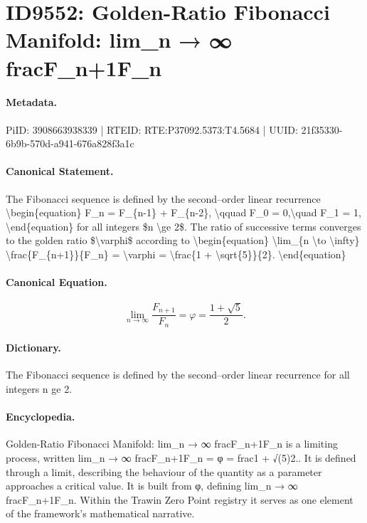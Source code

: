 \section*{ID9552: Golden-Ratio Fibonacci Manifold: lim\_n → ∞ fracF\_n+1F\_n}
\paragraph{Metadata.}
PiID: 3908663938339 | RTEID: RTE:P37092.5373:T4.5684 | UUID: 21f35330-6b9b-570d-a941-676a828f3a1c

\paragraph{Canonical Statement.}
The Fibonacci sequence is defined by the second–order linear recurrence \textbackslash{}begin\{equation\} F\_n = F\_\{n-1\} + F\_\{n-2\}, \textbackslash{}qquad F\_0 = 0,\textbackslash{}quad F\_1 = 1, \textbackslash{}end\{equation\} for all integers \$n \textbackslash{}ge 2\$. The ratio of successive terms converges to the golden ratio \$\textbackslash{}varphi\$ according to \textbackslash{}begin\{equation\} \textbackslash{}lim\_\{n \textbackslash{}to \textbackslash{}infty\} \textbackslash{}frac\{F\_\{n+1\}\}\{F\_n\} = \textbackslash{}varphi = \textbackslash{}frac\{1 + \textbackslash{}sqrt\{5\}\}\{2\}. \textbackslash{}end\{equation\}

\paragraph{Canonical Equation.}
\[
\lim_{n \to \infty} \frac{F_{n+1}}{F_n} = \varphi = \frac{1 + \sqrt{5}}{2}.
\]

\paragraph{Dictionary.}
The Fibonacci sequence is defined by the second–order linear recurrence for all integers n ge 2.

\paragraph{Encyclopedia.}
Golden-Ratio Fibonacci Manifold: lim\_n → ∞ fracF\_n+1F\_n is a limiting process, written lim\_n → ∞ fracF\_n+1F\_n = φ = frac1 + √(5)2.. It is defined through a limit, describing the behaviour of the quantity as a parameter approaches a critical value. It is built from φ, defining lim\_n → ∞ fracF\_n+1F\_n. Within the Trawin Zero Point registry it serves as one element of the framework's mathematical narrative.
